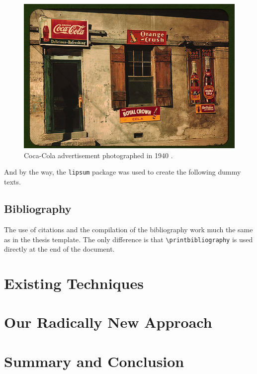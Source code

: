 \documentclass[english,twocolumn,smartquotes]{hgbarticle}
\begin{document}
\begin{figure}
\centering
\includegraphics[width=1.0\columnwidth]{cola-public-domain-photo-p}
\caption{Coca-Cola advertisement photographed in 1940 \cite{CocaCola1940}.}
\label{fig:CocaCola}
\end{figure}

And by the way, the \texttt{lipsum} package was used to create the following
dummy texts. 

\subsection{Bibliography}

The use of citations and the compilation of the bibliography work much the same
as in the thesis template. 
The only difference is that \verb!\printbibliography! is used directly at the end
of the document.


\section{Existing Techniques}

\lipsum[2-4]


\section{Our Radically New Approach}

\lipsum[5-7]


\section{Summary and Conclusion}

\lipsum[8-9]

\printbibliography %

\end{document}
